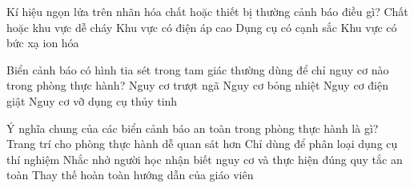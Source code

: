 



\begin{ex}
Kí hiệu ngọn lửa trên nhãn hóa chất hoặc thiết bị thường cảnh báo điều gì?
\choice
{\True Chất hoặc khu vực dễ cháy}
{Khu vực có điện áp cao}
{Dụng cụ có cạnh sắc}
{Khu vực có bức xạ ion hóa}
\end{ex}

\begin{ex}
Biển cảnh báo có hình tia sét trong tam giác thường dùng để chỉ nguy cơ nào trong phòng thực hành?
\choice
{Nguy cơ trượt ngã}
{Nguy cơ bỏng nhiệt}
{\True Nguy cơ điện giật}
{Nguy cơ vỡ dụng cụ thủy tinh}
\end{ex}

\begin{ex}
Ý nghĩa chung của các biển cảnh báo an toàn trong phòng thực hành là gì?
\choice
{Trang trí cho phòng thực hành dễ quan sát hơn}
{Chỉ dùng để phân loại dụng cụ thí nghiệm}
{\True Nhắc nhở người học nhận biết nguy cơ và thực hiện đúng quy tắc an toàn}
{Thay thế hoàn toàn hướng dẫn của giáo viên}
\end{ex}


